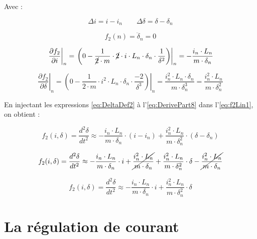 Avec :

\begin{equation}
    \Delta i = i-i_n \qquad
    \Delta\delta = \delta-\delta_n
    \label{eq:DeltaDef2}
\end{equation}

\begin{equation}
    f_2(n) = \ddot{\delta}_n = 0
    \label{eq:DerivePart6}
\end{equation}

\begin{equation}
    \left. \frac{\partial f_2}{\partial i} \right|_{n} = \left. \left( 0 - \frac{1}{\cancel{2}\cdot m}\cdot \cancel{2}\cdot i\cdot L_n \cdot\delta_n\cdot\frac{1}{\delta^2}\right) \right|_{n} = -\frac{i_n\cdot L_n}{m \cdot\delta_n}
    \label{eq:DerivePart7}
\end{equation}

\begin{equation}
    \left. \frac{\partial f_2}{\partial \delta} \right|_{n} = \left. \left( 0 - \frac{1}{2\cdot m}\cdot i^2\cdot L_n \cdot\delta_n\cdot\frac{-2}{\delta^3}\right) \right|_{n} = \frac{i_n^2\cdot L_n \cdot \delta_n}{m \cdot\delta_n^3}= \frac{i_n^2\cdot L_n}{m \cdot\delta_n^2}
    \label{eq:DerivePart8}
\end{equation}

En injectant les expressions \ref{eq:DeltaDef2} à l'\autoref{eq:DerivePart8} dans l'\autoref{eq:f2Lin1}, on obtient :

$$    f_2(i, \delta) = \frac{d^2\delta}{dt^2} \approx
    -\frac{i_n\cdot L_n}{m \cdot\delta_n}\cdot(i-i_n)
    + \frac{i_n^2\cdot L_n}{m \cdot\delta_n^2}\cdot(\delta-\delta_n)$$

$$    f_2(i, \delta) = \frac{d^2\delta}{dt^2} \approx
    -\frac{i_n\cdot L_n}{m \cdot\delta_n}\cdot i
    +\cancel{\frac{i_n^2\cdot L_n}{m \cdot\delta_n}}
    + \frac{i_n^2\cdot L_n}{m \cdot\delta_n^2}\cdot\delta
    -\cancel{\frac{i_n^2\cdot L_n}{m \cdot\delta_n}}$$

\begin{equation}
    f_2(i, \delta) = \frac{d^2\delta}{dt^2} \approx
    -\frac{i_n\cdot L_n}{m \cdot\delta_n}\cdot i
    + \frac{i_n^2\cdot L_n}{m \cdot\delta_n^2}\cdot\delta
    \label{eq:f2Lin2}
\end{equation}

\section{La régulation de courant}

